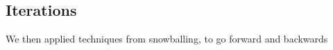 





 


\subsection{Iterations}

We then applied techniques from snowballing, to go forward and backwards 


